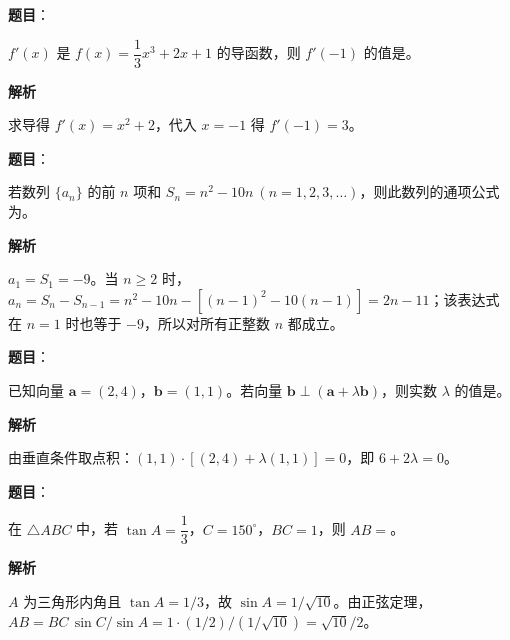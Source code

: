 \begin{answer}

\textbf{题目}：

$f'(x)$ 是 $f(x)=\dfrac{1}{3}x^3+2x+1$ 的导函数，则 $f'(-1)$ 的值是\gkblank{}。

\textbf{解析}

求导得 $f'(x)=x^2+2$，代入 $x=-1$ 得 $f'(-1)=3$。


\end{answer}
\begin{answer}

\textbf{题目}：

若数列 $\{a_n\}$ 的前 $n$ 项和 $S_n=n^2-10n\ (n=1,2,3,\ldots)$，则此数列的通项公式为\gkblank{}。

\textbf{解析}

$a_1=S_1=-9$。当 $n\geq2$ 时，$a_n=S_n-S_{n-1}=n^2-10n-[(n-1)^2-10(n-1)]=2n-11$；该表达式在 $n=1$ 时也等于 $-9$，所以对所有正整数 $n$ 都成立。


\end{answer}
\begin{answer}

\textbf{题目}：

已知向量 $\boldsymbol a=(2,4)$，$\boldsymbol b=(1,1)$。若向量 $\boldsymbol b\perp(\boldsymbol a+\lambda\boldsymbol b)$，则实数 $\lambda$ 的值是\gkblank{}。

\textbf{解析}

由垂直条件取点积：$(1,1)\cdot[(2,4)+\lambda(1,1)]=0$，即 $6+2\lambda=0$。


\end{answer}
\begin{answer}

\textbf{题目}：

在 $\triangle ABC$ 中，若 $\tan A=\dfrac{1}{3}$，$C=150^\circ$，$BC=1$，则 $AB=$\gkblank{}。

\textbf{解析}

$A$ 为三角形内角且 $\tan A=1/3$，故 $\sin A=1/\sqrt{10}$。由正弦定理，$AB=BC\,\sin C/\sin A=1\cdot(1/2)/(1/\sqrt{10})=\sqrt{10}/2$。


\end{answer}
